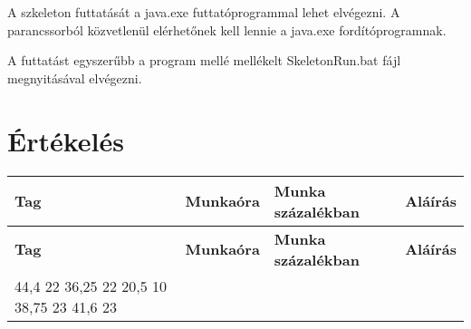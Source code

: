 

A szkeleton futtatását a java.exe futtatóprogrammal lehet elvégezni. A parancssorból közvetlenül elérhetőnek kell lennie a java.exe fordítóprogramnak. 

A futtatást egyszerűbb a program mellé mellékelt SkeletonRun.bat fájl megnyitásával elvégezni.

\section{Értékelés}
\newenvironment{ertekelesplusz}
{
	\begin{center}
	\begin{longtable}{| p{3cm} | r | r | p{6cm} |}
	\hline
	\multicolumn{1}{|p{3cm}|}{\textbf{Tag}} &
	\multicolumn{1}{l|}{\textbf{Munkaóra}}&
	\multicolumn{1}{l|}{\textbf{Munka százalékban}} &
	\multicolumn{1}{r|}{\textbf{Aláírás}} \tabularnewline \hline \hline 
	\endfirsthead

	\hline
	\multicolumn{1}{|p{3cm}|}{\textbf{Tag}} &
	\multicolumn{1}{l|}{\textbf{Munkaóra}}&
	\multicolumn{1}{l|}{\textbf{Munka százalékban}} &
	\multicolumn{1}{r|}{\textbf{Aláírás}} \tabularnewline \hline \hline 
	\endhead

}
{
	\end{longtable}
	\end{center}
}

\begin{ertekelesplusz}
\tag{Elekes} %
{44,4} %
{22}        %
\tag{Fuksz}
{36,25}
{22}
\tag{Nagy}
{20,5}
{10}
\tag{Rédey}
{38,75}
{23}
\tag{Seres}
{41,6}
{23}

\end{ertekelesplusz}

